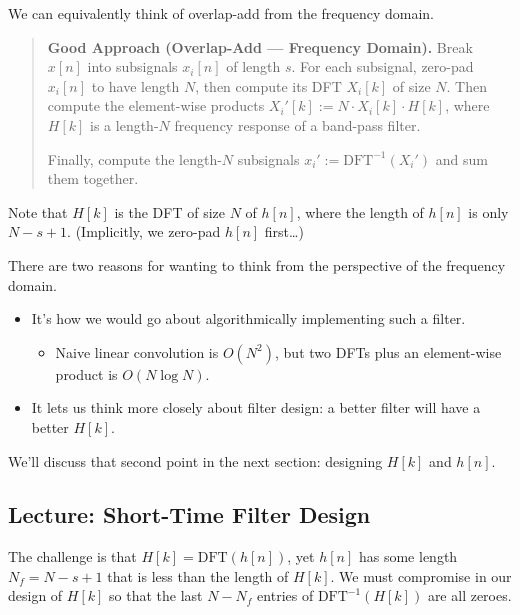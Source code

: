 We can equivalently think of overlap-add
from the frequency domain.

\begin{quote}
    \textbf{Good Approach (Overlap-Add --- Frequency Domain).}
    Break $x[n]$ into subsignals $x_i[n]$ of length $s$.
    For each subsignal, zero-pad $x_i[n]$ to have length $N$,
    then compute its DFT $X_i[k]$ of size $N$.
    Then compute the element-wise products $X_i'[k] := N \cdot X_i[k] \cdot H[k]$,
    where $H[k]$ is a length-$N$ frequency response of a band-pass filter.
    

    Finally, compute the length-$N$ subsignals
    $x_i' := \mathrm{DFT}^{-1}(X_i')$ and sum them together.
\end{quote}

Note that $H[k]$ is the DFT of size $N$ of $h[n]$,
where the length of $h[n]$ is only $N - s + 1$.
(Implicitly, we zero-pad $h[n]$ first\dots)

There are two reasons for wanting to think
from the perspective of the frequency domain.
\begin{itemize}
    \item It's how we would go about algorithmically implementing such a filter.
    \begin{itemize}
        \item Naive linear convolution is $O(N^2)$, but two DFTs plus an element-wise product
        is $O(N \log N)$.
    \end{itemize}
    \item It lets us think more closely about filter design:
    a better filter will have a better $H[k]$.
\end{itemize}
We'll discuss that second point in the next section:
designing $H[k]$ and $h[n]$.

\subsection{Lecture: Short-Time Filter Design}

The challenge is that $H[k] = \mathrm{DFT}(h[n])$,
yet $h[n]$ has some length $N_f = N - s + 1$
that is less than the length of $H[k]$.
We must compromise in our design of $H[k]$
so that the last $N - N_f$ entries of $\mathrm{DFT}^{-1}(H[k])$ are all zeroes.

